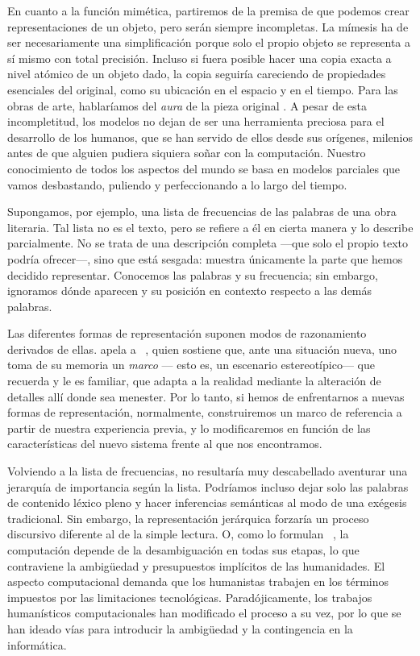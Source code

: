 En cuanto a la función mimética, partiremos de la premisa de que podemos crear representaciones de un objeto, pero serán siempre incompletas. La mímesis ha de ser necesariamente una simplificación porque solo el propio objeto se representa a sí mismo con total precisión. Incluso si fuera posible hacer una copia exacta a nivel atómico de un objeto dado, la copia seguiría careciendo de propiedades esenciales del original, como su ubicación en el espacio y en el tiempo. Para las obras de arte, hablaríamos del \textit{aura} de la pieza original \parencite{benjamin2013}. A pesar de esta incompletitud, los modelos no dejan de ser una herramienta preciosa para el desarrollo de los humanos, que se han servido de ellos desde sus orígenes, milenios antes de que alguien pudiera siquiera soñar con la computación. Nuestro conocimiento de todos los aspectos del mundo se basa en modelos parciales que vamos desbastando, puliendo y perfeccionando a lo largo del tiempo.

Supongamos, por ejemplo, una lista de frecuencias de las palabras de una obra literaria. Tal lista no es el texto, pero se refiere a él en cierta manera y lo describe parcialmente. No se trata de una descripción completa —que solo el propio texto podría ofrecer—, sino que está sesgada: muestra únicamente la parte que hemos decidido representar. Conocemos las palabras y su frecuencia; sin embargo, ignoramos dónde aparecen y su posición en contexto respecto a las demás palabras.

Las diferentes formas de representación suponen modos de razonamiento derivados de ellas. \citeauthor{unsworth2002} apela a \citeauthor{minsky1977}~\parencite*{minsky1977}, quien sostiene que, ante una situación nueva, uno toma de su memoria un \textit{marco} — esto es, un escenario estereotípico— que recuerda y le es familiar, que adapta a la realidad mediante la alteración de detalles allí donde sea menester. Por lo tanto, si hemos de enfrentarnos a nuevas formas de representación, normalmente, construiremos un marco de referencia a partir de nuestra experiencia previa, y lo modificaremos en función de las características del nuevo sistema frente al que nos encontramos.

Volviendo a la lista de frecuencias, no resultaría muy descabellado aventurar una jerarquía de importancia según la lista. Podríamos incluso dejar solo las palabras de contenido léxico pleno y hacer inferencias semánticas al modo de una exégesis tradicional. Sin embargo, la representación jerárquica forzaría un proceso discursivo diferente al de la simple lectura. O, como lo formulan \citeauthor{burdick2012}~\parencite*{burdick2012}, la computación depende de la desambiguación en todas sus etapas, lo que contraviene la ambigüedad y presupuestos implícitos de las humanidades. El aspecto computacional demanda que los humanistas trabajen en los términos impuestos por las limitaciones tecnológicas. Paradójicamente, los trabajos humanísticos computacionales han modificado el proceso a su vez, por lo que se han ideado vías para introducir la ambigüedad y la contingencia en la informática.

